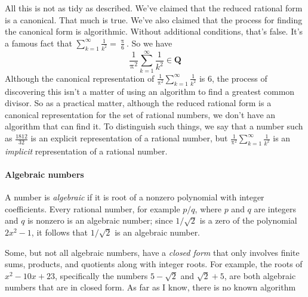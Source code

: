 \documentclass[12pt,fleqn]{article}
\newcommand{\rationals}{\mathbf{Q}}
\begin{document}
All this is not as tidy as described. We've claimed that the reduced rational form is a canonical. That much is true. We've also claimed that the 
process for finding the canonical form is algorithmic. Without additional conditions, that's false.  It's a famous fact that 
$\sum_{k=1}^\infty \frac{1}{k^2}  = \frac{\uppi}{6}$. So we have
\begin{equation}
\frac{1}{\uppi^2} \sum_{k=1}^\infty \frac{1}{k^2}  \in \rationals
\end{equation}
Although the canonical representation of $\frac{1}{\uppi^2} \sum_{k=1}^\infty \frac{1}{k^2}  $ is 6, the process of discovering this isn't a matter of 
using an algorithm to find a greatest common divisor.  So as a practical matter, although the reduced rational form is a canonical representation for the
set of rational numbers, we don't have an algorithm that can find it.  To distinguish such things, we say that a number such as $\frac{1812}{32}$  is
an explicit representation of a rational number, but $\frac{1}{\uppi^2} \sum_{k=1}^\infty \frac{1}{k^2}  $ is an \emph{implicit} representation of
a rational number.

\paragraph{Algebraic  numbers} A number is \emph{algebraic} if it is root of a nonzero polynomial with integer coefficients. Every rational number, for example 
$p/q$, where $p$ and $q$ are integers and $q$ is nonzero is an algebraic number; since $1/\sqrt{2}$ is a zero of the polynomial $2 x^2 - 1$, it
follows that $1/\sqrt{2}$ is an algebraic number. 

Some, but not all algebraic numbers, have a \emph{closed form} that only involves finite sums, products, and quotients along with integer roots. For example, the roots of 
$x^2 - 10 x + 23$, specifically the numbers $5-\sqrt{2}$ and $\sqrt{2}+5$, are both algebraic numbers that are in closed form.  As far as I know, there is no known
algorithm 
\end{document}
